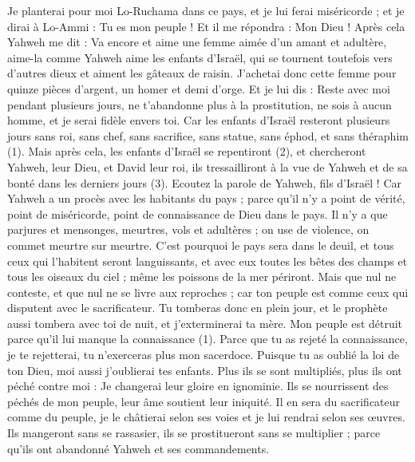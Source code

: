 \begin{multicols}{2}
Je planterai pour moi Lo-Ruchama dans ce pays, et je lui ferai miséricorde ; et je dirai à Lo-Ammi : Tu es mon peuple ! Et il me répondra : Mon Dieu !
\VerseOne{}Après cela Yahweh me dit : Va encore et aime une femme aimée d'un amant et adultère, aime-la comme Yahweh aime les enfants d'Israël, qui se tournent toutefois vers d'autres dieux et aiment les gâteaux de raisin.
J’achetai donc cette femme pour quinze pièces d'argent, un homer et demi d'orge.
Et je lui dis : Reste avec moi pendant plusieurs jours, ne t'abandonne plus à la prostitution, ne sois à aucun homme, et je serai fidèle envers toi.
Car les enfants d'Israël resteront plusieurs jours sans roi, sans chef, sans sacrifice, sans statue, sans éphod, et sans théraphim (1).
Mais après cela, les enfants d'Israël se repentiront (2), et chercheront Yahweh, leur Dieu, et David leur roi, ils tressailliront à la vue de Yahweh et de sa bonté dans les derniers jours (3).
\VerseOne{}Ecoutez la parole de Yahweh, fils d'Israël ! Car Yahweh a un procès avec les habitants du pays ; parce qu'il n'y a point de vérité, point de miséricorde, point de connaissance de Dieu dans le pays.
Il n'y a que parjures et mensonges, meurtres, vols et adultères ; on use de violence, on commet meurtre sur meurtre.
C'est pourquoi le pays sera dans le deuil, et tous ceux qui l’habitent seront languissants, et avec eux toutes les bêtes des champs et tous les oiseaux du ciel ; même les poissons de la mer périront.
Mais que nul ne conteste, et que nul ne se livre aux reproches ; car ton peuple est comme ceux qui disputent avec le sacrificateur.
Tu tomberas donc en plein jour, et le prophète aussi tombera avec toi de nuit, et j'exterminerai ta mère.
Mon peuple est détruit parce qu’il lui manque la connaissance (1). Parce que tu as rejeté la connaissance, je te rejetterai, tu n'exerceras plus mon sacerdoce. Puisque tu as oublié la loi de ton Dieu, moi aussi j'oublierai tes enfants.
Plus ils se sont multipliés, plus ils ont péché contre moi : Je changerai leur gloire en ignominie.
Ils se nourrissent des péchés de mon peuple, leur âme soutient leur iniquité.
Il en sera du sacrificateur comme du peuple, je le châtierai selon ses voies et je lui rendrai selon ses œuvres.
Ils mangeront sans se rassasier, ils se prostitueront sans se multiplier ; parce qu'ils ont abandonné Yahweh et ses commandements.

\end{multicols}
